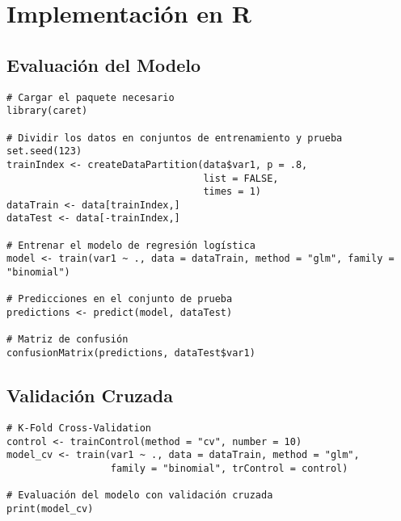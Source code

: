 \section{Implementación en R}

\subsection{Evaluación del Modelo}

\begin{verbatim}
# Cargar el paquete necesario
library(caret)

# Dividir los datos en conjuntos de entrenamiento y prueba
set.seed(123)
trainIndex <- createDataPartition(data$var1, p = .8, 
                                  list = FALSE, 
                                  times = 1)
dataTrain <- data[trainIndex,]
dataTest <- data[-trainIndex,]

# Entrenar el modelo de regresión logística
model <- train(var1 ~ ., data = dataTrain, method = "glm", family = "binomial")

# Predicciones en el conjunto de prueba
predictions <- predict(model, dataTest)

# Matriz de confusión
confusionMatrix(predictions, dataTest$var1)
\end{verbatim}

\subsection{Validación Cruzada}

\begin{verbatim}
# K-Fold Cross-Validation
control <- trainControl(method = "cv", number = 10)
model_cv <- train(var1 ~ ., data = dataTrain, method = "glm", 
                  family = "binomial", trControl = control)

# Evaluación del modelo con validación cruzada
print(model_cv)
\end{verbatim}

